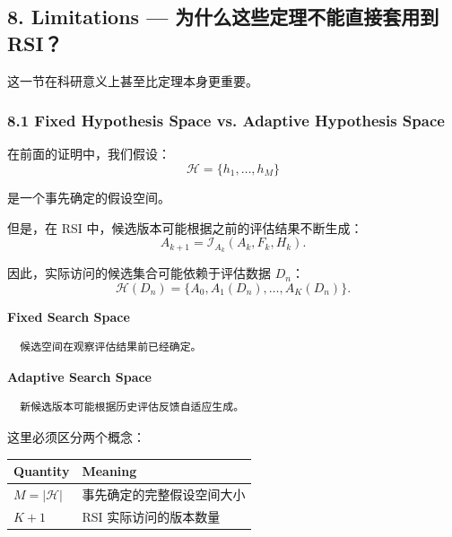\hypertarget{part-2-14-0001-limitations-ux4e3aux4ec0ux4e48ux8fd9ux4e9bux5b9aux7406ux4e0dux80fdux76f4ux63a5ux5957ux7528ux5230-rsi}{%
\subsection{8. Limitations --- 为什么这些定理不能直接套用到 RSI？}\label{part-2-14-0001-limitations-ux4e3aux4ec0ux4e48ux8fd9ux4e9bux5b9aux7406ux4e0dux80fdux76f4ux63a5ux5957ux7528ux5230-rsi}}

这一节在科研意义上甚至比定理本身更重要。

\hypertarget{part-2-14-0001-fixed-hypothesis-space-vs.-adaptive-hypothesis-space}{%
\subsubsection{8.1 Fixed Hypothesis Space vs. Adaptive Hypothesis Space}\label{part-2-14-0001-fixed-hypothesis-space-vs.-adaptive-hypothesis-space}}

在前面的证明中，我们假设：
\[\mathcal H=\{h_1,\ldots,h_M\}\]

是一个事先确定的假设空间。

但是，在 RSI 中，候选版本可能根据之前的评估结果不断生成：
\[A_{k+1}
=
\mathcal I_{A_k}(A_k,F_k,H_k).\]

因此，实际访问的候选集合可能依赖于评估数据 \(D_n\)：
\[\mathcal H(D_n)
=
\{A_0,A_1(D_n),\ldots,A_K(D_n)\}.\]

\textbf{Fixed Search Space}


\begin{verbatim}
  候选空间在观察评估结果前已经确定。
\end{verbatim}

\textbf{Adaptive Search Space}


\begin{verbatim}
  新候选版本可能根据历史评估反馈自适应生成。
\end{verbatim}

这里必须区分两个概念：

\begin{readertable}
\begin{longtable}[]{@{}
  >{\raggedright\arraybackslash}p{}
  >{\raggedright\arraybackslash}p{}@{}}
\toprule
Quantity & Meaning \\
\midrule
\endhead
\(M=|\mathcal H|\) & 事先确定的完整假设空间大小 \\
\(K+1\) & RSI 实际访问的版本数量 \\
\bottomrule
\end{longtable}
\end{readertable}

